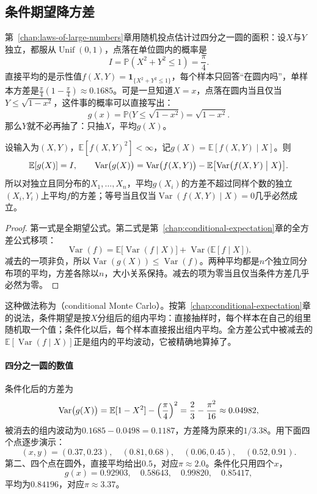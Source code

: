 \subsection{条件期望降方差}
\label{sec:vr-conditioning}

第~\ref{chap:laws-of-large-numbers}章用随机投点估计过四分之一圆的面积：设$X$与$Y$独立，都服从$\operatorname{Unif}(0,1)$，点落在单位圆内的概率是
\[
 I=\mathbb{P}(X^2+Y^2\leq1)=\frac{\pi}{4} .
\]
直接平均的是示性值$f(X,Y)=\mathbf{1}_{\{X^2+Y^2\leq1\}}$，每个样本只回答“在圆内吗”，单样本方差是$\tfrac{\pi}{4}(1-\tfrac{\pi}{4})\approx0.1685$。可是一旦知道$X=x$，点落在圆内当且仅当$Y\leq\sqrt{1-x^2}$，这件事的概率可以直接写出：
\[
 g(x)=\mathbb{P}\bigl(Y\leq\sqrt{1-x^2}\bigr)=\sqrt{1-x^2} .
\]
那么$Y$就不必再抽了：只抽$X$，平均$g(X)$。

\begin{theorem}[条件期望不增加方差]
\label{thm:vr-conditioning}
设输入为$(X,Y)$，$\mathbb{E}[f(X,Y)^2]<\infty$，记$g(X)=\mathbb{E}[f(X,Y)\mid X]$。则
\begin{equation}
 \mathbb{E}[g(X)]=I,\qquad \operatorname{Var}\bigl(g(X)\bigr)=\operatorname{Var}\bigl(f(X,Y)\bigr)-\mathbb{E}\bigl[\operatorname{Var}\bigl(f(X,Y)\bigm|X\bigr)\bigr] .
 \label{eq:vr-conditioning}
\end{equation}
所以对独立且同分布的$X_1,\dots,X_n$，平均$g(X_i)$的方差不超过同样个数的独立$(X_i,Y_i)$上平均$f$的方差；等号当且仅当$\operatorname{Var}(f(X,Y)\mid X)=0$几乎必然成立。
\end{theorem}

\begin{proof}
第一式是全期望公式。第二式是第~\ref{chap:conditional-expectation}章的全方差公式移项：
\[
 \operatorname{Var}(f)=\mathbb{E}\bigl[\operatorname{Var}(f\mid X)\bigr]+\operatorname{Var}\bigl(\mathbb{E}[f\mid X]\bigr) .
\]
减去的一项非负，所以$\operatorname{Var}(g(X))\leq\operatorname{Var}(f)$。两种平均都是$n$个独立同分布项的平均，方差各除以$n$，大小关系保持。减去的项为零当且仅当条件方差几乎必然为零。
\end{proof}

这种做法称为（conditional Monte Carlo）。按第~\ref{chap:conditional-expectation}章的说法，条件期望是按$X$分组后的组内平均：直接抽样时，每个样本在自己的组里随机取一个值；条件化以后，每个样本直接报出组内平均。全方差公式中被减去的$\mathbb{E}[\operatorname{Var}(f\mid X)]$正是组内的平均波动，它被精确地算掉了。

\paragraph{四分之一圆的数值}
条件化后的方差为
\[
 \operatorname{Var}\bigl(g(X)\bigr)=\mathbb{E}[1-X^2]-\Bigl(\frac{\pi}{4}\Bigr)^2=\frac23-\frac{\pi^2}{16}\approx0.04982 ,
\]
被消去的组内波动为$0.1685-0.0498=0.1187$，方差降为原来的$1/3.38$。用下面四个点逐步演示：
\[
 (x,y)=(0.37,0.23),\quad(0.81,0.68),\quad(0.06,0.45),\quad(0.52,0.91) .
\]
第二、四个点在圆外，直接平均给出$0.5$，对应$\pi\approx2.0$。条件化只用四个$x$，
\[
 g(x)=0.92903,\quad 0.58643,\quad 0.99820,\quad 0.85417 ,
\]
平均为$0.84196$，对应$\pi\approx3.37$。

